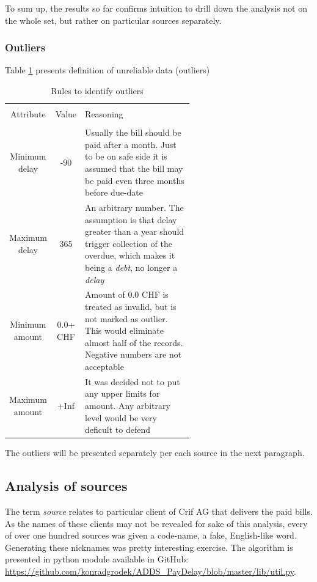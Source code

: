 \documentclass{article}
\begin{document}
To sum up, the results so far confirms intuition to drill down the analysis not on the whole set, but rather on particular sources separately.

\subsubsection{Outliers}

Table \ref{tab:002_outlier_def} presents definition of unreliable data (outliers)

\begin{table}[!htbp]
    \centering
    \caption{Rules to identify outliers}
    \label{tab:002_outlier_def}
    \begin{tabular}{c c p{0.6\linewidth}}
    \hline\hline \\
    Attribute & Value & Reasoning \\
    \hline \\
    Minimum delay & -90 & Usually the bill should be paid after a month. Just to be on safe side it is assumed that the bill may be paid even three months before due-date\\
    Maximum delay & 365 & An arbitrary number. The assumption is that delay greater than a year should trigger collection of the overdue, which makes it being a \textit{debt}, no longer a \textit{delay} \\
    Minimum amount & 0.0+ CHF & Amount of 0.0 CHF is treated as invalid, but is not marked as outlier. This would eliminate almost half of the records. Negative numbers are not acceptable \\
    Maximum amount & +Inf & It was decided not to put any upper limits for amount. Any arbitrary level would be very deficult to defend \\
    \end{tabular}
\end{table}

The outliers will be presented separately per each source in the next paragraph.\par

\subsection{Analysis of sources}

The term \textit{source} relates to particular client of Crif AG that delivers the paid bills.
As the names of these clients may not be revealed for sake of this analysis, every of over one hundred sources was given a code-name, a fake, English-like word.
Generating these nicknames was pretty interesting exercise.
The algorithm is presented in python module available in GitHub: \url{https://github.com/konradgrodek/ADDS_PayDelay/blob/master/lib/util.py}.
\end{document}
